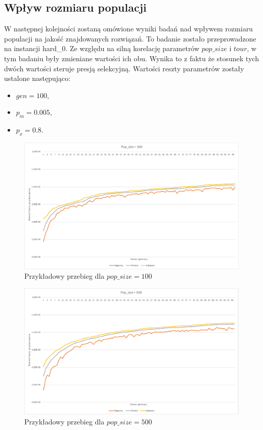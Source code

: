 \documentclass{article}
\begin{document}
	\subsection{Wpływ rozmiaru populacji}
	W następnej kolejności zostaną omówione wyniki badań nad wpływem rozmiaru populacji na jakość znajdowanych rozwiązań. To badanie zostało przeprowadzone na instancji hard\_0. Ze względu na silną korelację parametrów $pop\_size$ i $tour$, w tym badaniu były zmieniane wartości ich obu. Wynika to z faktu że stosunek tych dwóch wartości steruje presją selekcyjną. Wartości reszty parametrów zostały ustalone następująco:
	\begin{itemize}
		\item $gen = 100$,
		\item $p_m = 0.005$,
		\item $p_x = 0.8$.
	\end{itemize}
	
	\begin{figure}[H]
		\centering
		\includegraphics[width=1\linewidth]{popsize100.png}
		\caption{Przykładowy przebieg dla $pop\_size=100$}
		\label{fig:pop100}
	\end{figure}
	
	
	\begin{figure}[H]
		\centering
		\includegraphics[width=1\linewidth]{popsize500.png}
		\caption{Przykładowy przebieg dla $pop\_size=500$}
		\label{fig:pop500}
	\end{figure}
	
\end{document}
